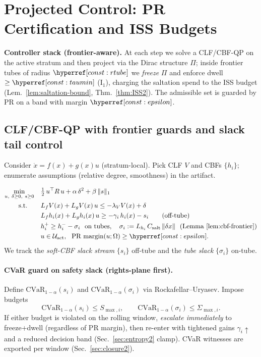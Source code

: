 \section{Projected Control: PR Certification and ISS Budgets}\label{sec:ctrl2}

\noindent\textbf{Controller stack (frontier-aware).}
At each step we solve a CLF/CBF-QP on the active stratum and then project via the Dirac structure $\Pi$; inside frontier tubes of radius $\constref{rtube}$ we \emph{freeze} $\Pi$ and enforce dwell $\ge\constref{taumin}$ (I$_1$), charging the saltation spend to the ISS budget (Lem.~\ref{lem:saltation-bound}, Thm.~\ref{thm:ISS2}). The admissible set is guarded by PR on a band with margin $\constref{epsilon}$.

\subsection*{CLF/CBF-QP with frontier guards and slack tail control}
Consider $\dot x=f(x)+g(x)u$ (stratum-local). Pick CLF $V$ and CBFs $\{h_i\}$; enumerate assumptions (relative degree, smoothness) in the artifact.

\[
\begin{aligned}
\min_{u,\ \delta\ge0,\ s\ge 0}\quad & \tfrac12\,u^\top R\,u + \alpha\,\delta^2 + \beta\,\|s\|_1 \\
\text{s.t.}\qquad & L_f V(x)+L_g V(x)\,u \le -\lambda_V V(x) + \delta \\
& L_f h_i(x)+L_g h_i(x)\,u \ge -\gamma_i\,h_i(x) - s_i \qquad \text{(off-tube)}\\
& h_i^+ \ge h_i^- - \sigma_i \ \ \text{on tubes},\quad \sigma_i:=L_{h_i}\,C_{\mathrm{salt}}\,\|\delta x\| \ \ (\text{Lemma \ref{lem:cbf-frontier}})\\
& u\in \mathcal U_{\text{act}},\ \ \text{PR margin}(u;\Omega)\ge \constref{epsilon}.
\end{aligned}
\]
We track the \emph{soft-CBF slack stream} $\{s_i\}$ off-tube and the \emph{tube slack} $\{\sigma_i\}$ on-tube.

\paragraph{CVaR guard on safety slack (rights-plane first).}
Define $\mathrm{CVaR}_{1-\alpha}(s_i)$ and $\mathrm{CVaR}_{1-\alpha}(\sigma_i)$ via Rockafellar–Uryasev. Impose budgets
\[
\mathrm{CVaR}_{1-\alpha}(s_i) \le S_{\max,i},\qquad
\mathrm{CVaR}_{1-\alpha}(\sigma_i) \le \Sigma_{\max,i}.
\]
If either budget is violated on the rolling window, \emph{escalate immediately} to freeze+dwell (regardless of PR margin), then re-enter with tightened gains $\gamma_i\uparrow$ and a reduced decision band (Sec.~\ref{sec:entropy2} clamp). CVaR witnesses are exported per window (Sec.~\ref{sec:closure2}).

